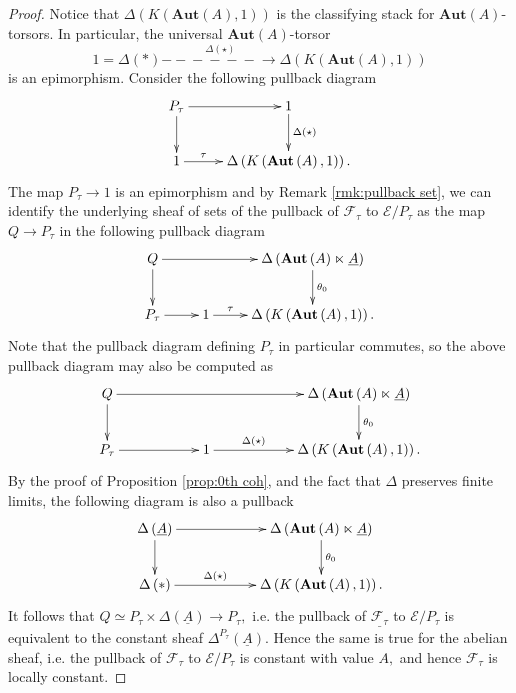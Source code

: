 \documentclass[12pt]{amsart}
\theoremstyle{definition}
\newcommand{\cE}{\mathcal{E}}
\newcommand{\cF}{\mathcal{F}}
\def\Aut{\mathbf{Aut}}
\def\longlongrightarrow{-\!\!\!-\!\!\!-\!\!\!-\!\!\!-\!\!\!-\!\!\!\longrightarrow}
\begin{document}
\begin{proof}
Notice that $\Delta\left(K\left(\Aut\left(A\right),1\right)\right)$ is the classifying stack for $\Aut\left(A\right)$-torsors. In particular, the universal $\Aut\left(A\right)$-torsor $$1=\Delta\left(*\right)\stackrel{\Delta\left(\star\right)}{\longlongrightarrow} \Delta\left(K\left(\Aut\left(A\right),1\right)\right)$$ is an epimorphism. Consider the following pullback diagram
$$\xymatrix{P_\tau \ar[r] \ar[d] & 1 \ar[d]^-{\Delta\left(\star\right)}\\
1 \ar[r]^-{\tau} & \Delta\left(K\left(\Aut\left(A\right),1\right)\right).}$$
The map $P_\tau \to 1$ is an epimorphism and by Remark \ref{rmk:pullback set}, we can identify the underlying sheaf of sets of the pullback of $\cF_\tau$ to $\cE/P_\tau$ 
as the map $Q \to P_{\tau}$ in the following pullback diagram
$$\xymatrix{Q \ar[rr] \ar[d] &  &\Delta\left(\Aut\left(A\right) \ltimes \underline{A}\right) \ar[d]^-{\theta_0}\\
P_{\tau} \ar[r] & 1 \ar[r]^-{\tau} & \Delta\left(K\left(\Aut\left(A\right),1\right)\right).}$$
Note that the pullback diagram defining $P_\tau$ in particular commutes, so the above pullback diagram may also be computed as
$$\xymatrix@C=2cm{Q \ar[rr] \ar[d] &  &\Delta\left(\Aut\left(A\right) \ltimes \underline{A}\right) \ar[d]^-{\theta_0}\\
P_{\tau} \ar[r] & 1 \ar[r]^-{\Delta\left(\star\right)} & \Delta\left(K\left(\Aut\left(A\right),1\right)\right).}$$
By the proof of Proposition \ref{prop:0th coh}, and the fact that $\Delta$ preserves finite limits, the following diagram is also a pullback
$$\xymatrix@C=2cm{\Delta\left(\underline{A}\right) \ar[d] \ar[r] & \Delta\left(\Aut\left(A\right) \ltimes \underline{A}\right) \ar[d]^-{\theta_0}\\
\Delta\left(\ast\right) \ar[r]^-{\Delta\left(\star\right)} & \Delta\left(K\left(\Aut\left(A\right),1\right)\right).}$$
It follows that $Q\simeq P_\tau \times \Delta\left(\underline{A}\right) \to P_{\tau},$ i.e. the pullback of $\underline{\cF_{\tau}}$ to $\cE/P_\tau$ is equivalent to the constant sheaf $\Delta^{P_\tau}\left(\underline{A}\right).$ Hence the same is true for the abelian sheaf, i.e. the pullback of $\cF_{\tau}$ to $\cE/P_\tau$ is constant with value $A,$ and hence $\cF_\tau$ is locally constant.
\end{proof}
\end{document}
